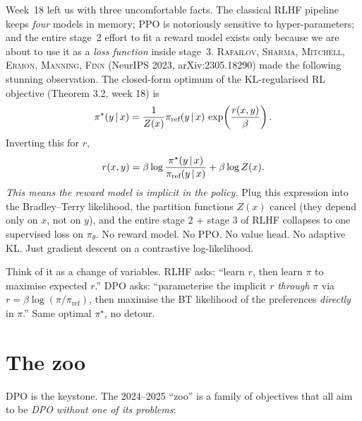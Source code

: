 \documentclass[11pt,oneside]{scrbook}
\begin{document}
Week~18 left us with three uncomfortable facts. The classical RLHF
pipeline keeps \emph{four} models in memory; PPO is notoriously
sensitive to hyper-parameters; and the entire stage~2 effort to fit a
reward model exists only because we are about to use it as a
\emph{loss function} inside stage~3. \textsc{Rafailov, Sharma,
Mitchell, Ermon, Manning, Finn} (NeurIPS 2023, arXiv:2305.18290) made
the following stunning observation. The closed-form optimum of the
KL-regularised RL objective (Theorem 3.2, week 18) is
\[
\pi^\star(y \,\vert\, x) =
  \frac{1}{Z(x)} \pi_{\text{ref}}(y \,\vert\, x)\,
  \exp\!\left(\frac{r(x,y)}{\beta}\right).
\]
Inverting this for $r$,
\[
r(x, y) = \beta \log\frac{\pi^\star(y \,\vert\, x)}{\pi_{\text{ref}}(y \,\vert\, x)}
          + \beta \log Z(x).
\]
\emph{This means the reward model is implicit in the policy.} Plug
this expression into the Bradley--Terry likelihood, the partition
functions $Z(x)$ cancel (they depend only on $x$, not on $y$), and
the entire stage 2 + stage 3 of RLHF collapses to one supervised loss
on $\pi_\theta$. No reward model. No PPO. No value head. No
adaptive KL. Just gradient descent on a contrastive log-likelihood.

\begin{intuition}
Think of it as a change of variables. RLHF asks: ``learn $r$, then
learn $\pi$ to maximise expected $r$.'' DPO asks: ``parameterise the
implicit $r$ \emph{through} $\pi$ via $r = \beta\log(\pi/\pi_\text{ref})$,
then maximise the BT likelihood of the preferences \emph{directly}
in $\pi$.'' Same optimal $\pi^\star$, no detour.
\end{intuition}

\section{The zoo}

DPO is the keystone. The 2024--2025 ``zoo'' is a family of objectives
that all aim to be \emph{DPO without one of its problems}:
\end{document}
